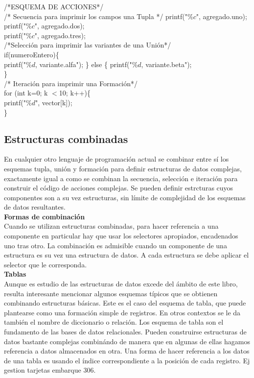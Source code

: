 \documentclass[11pt,a4paper]{article}
\begin{document}
  	/*ESQUEMA DE ACCIONES*/\\
  	/* Secuencia para imprimir los campos una Tupla */
  	printf("$\%c$", agregado.uno);\\
  	printf("$\%c$", agregado.dos);\\
  	printf("$\%c$", agregado.tres);\\
  	/*Selección para imprimir las variantes de una Unión*/\\
  	if(numeroEntero)\{
  	\\
  	printf("$\%d$, variante.alfa");
  	\} else \{
  	printf("$\%d$, variante.beta");\\
  	\}\\
  	/* Iteración para imprimir una Formación*/ \\
  	for (int k=0; k $<$10; k++)\{\\
  	printf("$\%d$", vector[k]);\\
  	\}\\
  	\subsection{Estructuras combinadas}
  	En cualquier otro lenguaje de programación actual se
  	combinar entre sí los esquemas tupla, unión y formación para definir estructuras de datos complejas, exactamente igual a como se combinan la secuencia,
  	selección e iteración para construir el código de acciones complejas. Se pueden definir estrcturas
  	cuyos componentes son a su vez estructuras, sin límite de complejidad de los
  	esquemas de datos resultantes.\\
  	\textbf{Formas de combinación}\\
  	Cuando se utilizan estructuras combinadas, para hacer referencia a una componente
  	en particular hay que usar los selectores apropiados, encadenados uno tras otro. La combinación es admisible cuando un componente de una estructura es su vez una estructura de datos. A cada
  	estructura se debe aplicar el selector que le corresponda.
  	\\
  	\textbf{Tablas}\\
  	Aunque es estudio de las estructuras de datos excede del ámbito de este libro,
  	resulta interesante mencionar algunos esquemas típicos que se obtienen combinando
  	estructuras básicas. Este es el caso del esquema de tabla, que puede
  	plantearse como una formación simple de registros. En otros contextos se le
  	da también el nombre de diccionario o relación. Los esquema de tabla son el
  	fundamento de las bases de datos relacionales. Pueden construirse estructuras de datos bastante complejas combinándo de manera que en algunas de ellas hagamos referencia a datos almacenados
  	en otra. Una forma de hacer referencia a los datos de una tabla es usando
  	el índice correspondiente a la posición de cada registro. Ej gestion tarjetas embarque 306.
\end{document}

